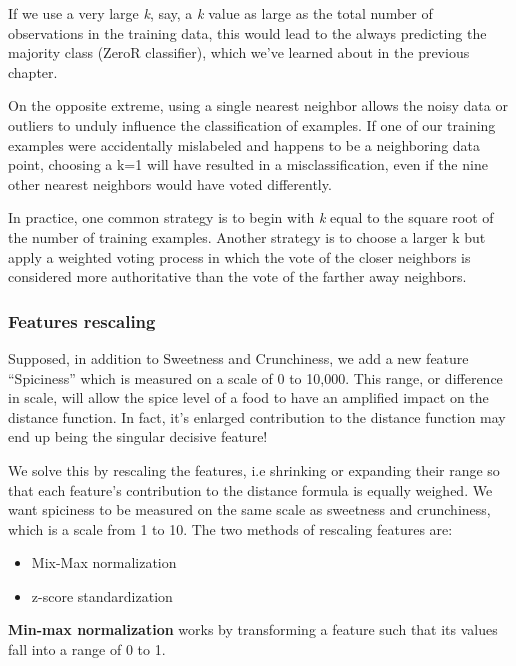 \documentclass[
]{article}
\providecommand{\tightlist}{%
  \setlength{\itemsep}{0pt}\setlength{\parskip}{0pt}}
\begin{document}
If we use a very large \emph{k}, say, a \emph{k} value as large as the
total number of observations in the training data, this would lead to
the always predicting the majority class (ZeroR classifier), which we've
learned about in the previous chapter.

On the opposite extreme, using a single nearest neighbor allows the
noisy data or outliers to unduly influence the classification of
examples. If one of our training examples were accidentally mislabeled
and happens to be a neighboring data point, choosing a k=1 will have
resulted in a misclassification, even if the nine other nearest
neighbors would have voted differently.

In practice, one common strategy is to begin with \emph{k} equal to the
square root of the number of training examples. Another strategy is to
choose a larger k but apply a weighted voting process in which the vote
of the closer neighbors is considered more authoritative than the vote
of the farther away neighbors.

\hypertarget{features-rescaling}{%
\subsubsection{Features rescaling}\label{features-rescaling}}

Supposed, in addition to Sweetness and Crunchiness, we add a new feature
``Spiciness'' which is measured on a scale of 0 to 10,000. This range,
or difference in scale, will allow the spice level of a food to have an
amplified impact on the distance function. In fact, it's enlarged
contribution to the distance function may end up being the singular
decisive feature!

We solve this by rescaling the features, i.e shrinking or expanding
their range so that each feature's contribution to the distance formula
is equally weighed. We want spiciness to be measured on the same scale
as sweetness and crunchiness, which is a scale from 1 to 10. The two
methods of rescaling features are:

\begin{itemize}
\tightlist
\item
  Mix-Max normalization\\
\item
  z-score standardization
\end{itemize}

\textbf{Min-max normalization} works by transforming a feature such that
its values fall into a range of 0 to 1.
\end{document}
